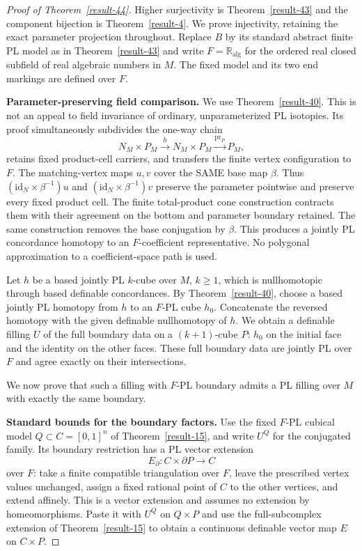 \documentclass[11pt,a4paper]{article}
\theoremstyle{definition}
\begin{document}
\begin{proof}[Proof of Theorem~\ref{result-44}]
Higher surjectivity is Theorem~\ref{result-43} and the component bijection is
Theorem~\ref{result-4}. We prove injectivity, retaining the exact parameter
projection throughout. Replace $B$ by its standard abstract
finite PL model as in Theorem~\ref{result-43} and write $F=\mathbb R_{\mathrm{alg}}$
for the ordered real closed subfield of real algebraic numbers
in $M$. The fixed model and its two end markings are defined
over $F$.

\textbf{Parameter-preserving field comparison.}\quad
We use Theorem~\ref{result-40}. This is not an
appeal to field invariance of ordinary, unparameterized PL
isotopies. Its proof simultaneously subdivides the one-way
chain
\[
 N_M\times P_M\xrightarrow{h}N_M\times P_M
                  \xrightarrow{\operatorname{pr}_P}P_M,
\]
retains fixed product-cell carriers, and transfers the finite
vertex configuration to $F$. The matching-vertex maps $u,v$
cover the SAME base map $\beta$. Thus
$(\mathrm{id}_N\times\beta^{-1})u$ and
$(\mathrm{id}_N\times\beta^{-1})v$ preserve the parameter
pointwise and preserve every fixed product cell.
The finite total-product cone construction contracts them
with their agreement on the bottom and parameter boundary
retained. The same construction removes the base conjugation
by $\beta$. This produces a jointly PL concordance
homotopy to an $F$-coefficient representative. No polygonal
approximation to a coefficient-space path is used.

Let $h$ be a based jointly PL $k$-cube over $M$, $k\ge1$,
which is nullhomotopic through based definable concordances.
By Theorem~\ref{result-40}, choose a based jointly PL homotopy from $h$ to
an $F$-PL cube $h_0$. Concatenate the reversed homotopy
with the given definable nullhomotopy of $h$. We obtain a
definable filling $U$ of the full boundary data on a
$(k+1)$-cube $P$: $h_0$ on the initial face and the identity
on the other faces. These full boundary data are jointly PL
over $F$ and agree exactly on their intersections.

We now prove that such a filling with $F$-PL boundary admits
a PL filling over $M$ with exactly the same boundary.

\textbf{Standard bounds for the boundary factors.}\quad
Use the fixed $F$-PL cubical model $Q\subset C=[0,1]^n$ of
Theorem~\ref{result-15}, and write $U^Q$ for the conjugated family.
Its boundary restriction has a PL vector extension
\[
 E_\partial:C\times\partial P\longrightarrow C
\]
over $F$: take a finite compatible triangulation over $F$,
leave the prescribed vertex values unchanged, assign a
fixed rational point of $C$ to the other vertices, and
extend affinely. This is a vector extension and assumes
no extension by homeomorphisms. Paste it with $U^Q$ on
$Q\times P$ and use the full-subcomplex extension of Theorem~\ref{result-15}
to obtain a continuous definable vector map $E$ on $C\times P$.


\end{proof}
\end{document}

